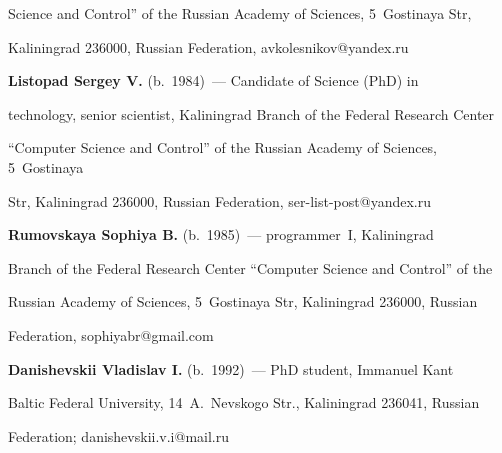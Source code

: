 Science and Control'' of the Russian Academy of Sciences, 5~Gostinaya Str, 


Kaliningrad 236000, Russian Federation, \mbox{avkolesnikov@yandex.ru} 


  


  \vspace*{4pt}


  


  \noindent


  \textbf{Listopad Sergey V.} (b.\ 1984)~--- Candidate of  Science (PhD) in 


technology, senior scientist, Kaliningrad Branch of the Federal Research Center 


``Computer Science and Control'' of the Russian Academy of Sciences, 5~Gostinaya 


Str, Kaliningrad 236000, Russian Federation, \mbox{ser-list-post@yandex.ru} 


  


  \vspace*{4pt}


  


  \noindent


  \textbf{Rumovskaya Sophiya B.} (b.\ 1985)~--- programmer~I, Kaliningrad 


Branch of the Federal Research Center ``Computer Science and Control'' of the 


Russian Academy of Sciences, 5~Gostinaya Str, Kaliningrad 236000, Russian 


Federation, \mbox{sophiyabr@gmail.com}  


  


  


  \vspace*{4pt}


  


  \noindent


  \textbf{Danishevskii Vladislav I.} (b.\ 1992)~--- PhD student, Immanuel Kant 


Baltic Federal University, 14~A.~Nevskogo Str., Kaliningrad 236041, Russian 


Federation; \mbox{danishevskii.v.i@mail.ru} 


\label{end\stat}








\renewcommand{\bibname}{\protect\rm Литература} 


    


